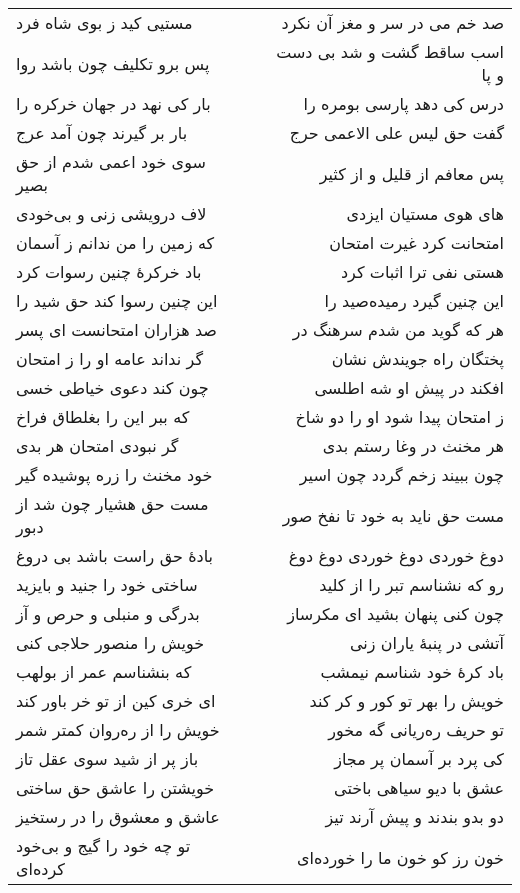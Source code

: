 \begin{center}
\begin{longtable}{l p{0.5cm} r}
مستیی کید ز بوی شاه فرد
&&
صد خم می در سر و مغز آن نکرد
\\
پس برو تکلیف چون باشد روا
&&
اسب ساقط گشت و شد بی دست و پا
\\
بار کی نهد در جهان خرکره را
&&
درس کی دهد پارسی بومره را
\\
بار بر گیرند چون آمد عرج
&&
گفت حق لیس علی الاعمی حرج
\\
سوی خود اعمی شدم از حق بصیر
&&
پس معافم از قلیل و از کثیر
\\
لاف درویشی زنی و بی‌خودی
&&
های هوی مستیان ایزدی
\\
که زمین را من ندانم ز آسمان
&&
امتحانت کرد غیرت امتحان
\\
باد خرکرهٔ چنین رسوات کرد
&&
هستی نفی ترا اثبات کرد
\\
این چنین رسوا کند حق شید را
&&
این چنین گیرد رمیده‌صید را
\\
صد هزاران امتحانست ای پسر
&&
هر که گوید من شدم سرهنگ در
\\
گر نداند عامه او را ز امتحان
&&
پختگان راه جویندش نشان
\\
چون کند دعوی خیاطی خسی
&&
افکند در پیش او شه اطلسی
\\
که ببر این را بغلطاق فراخ
&&
ز امتحان پیدا شود او را دو شاخ
\\
گر نبودی امتحان هر بدی
&&
هر مخنث در وغا رستم بدی
\\
خود مخنث را زره پوشیده گیر
&&
چون ببیند زخم گردد چون اسیر
\\
مست حق هشیار چون شد از دبور
&&
مست حق ناید به خود تا نفخ صور
\\
بادهٔ حق راست باشد بی دروغ
&&
دوغ خوردی دوغ خوردی دوغ دوغ
\\
ساختی خود را جنید و بایزید
&&
رو که نشناسم تبر را از کلید
\\
بدرگی و منبلی و حرص و آز
&&
چون کنی پنهان بشید ای مکرساز
\\
خویش را منصور حلاجی کنی
&&
آتشی در پنبهٔ یاران زنی
\\
که بنشناسم عمر از بولهب
&&
باد کرهٔ خود شناسم نیمشب
\\
ای خری کین از تو خر باور کند
&&
خویش را بهر تو کور و کر کند
\\
خویش را از ره‌روان کمتر شمر
&&
تو حریف ره‌ریانی گه مخور
\\
باز پر از شید سوی عقل تاز
&&
کی پرد بر آسمان پر مجاز
\\
خویشتن را عاشق حق ساختی
&&
عشق با دیو سیاهی باختی
\\
عاشق و معشوق را در رستخیز
&&
دو بدو بندند و پیش آرند تیز
\\
تو چه خود را گیج و بی‌خود کرده‌ای
&&
خون رز کو خون ما را خورده‌ای

\end{longtable}
\end{center}

